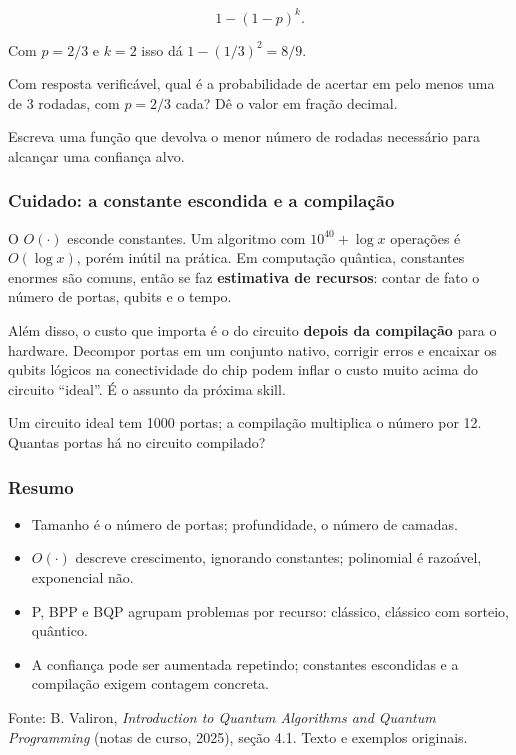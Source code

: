 \[
1-(1-p)^k .
\]

Com \(p = 2/3\) e \(k=2\) isso dá \(1-(1/3)^2 = 8/9\).

Com resposta verificável, qual é a probabilidade de acertar em pelo menos uma de 3 rodadas, com \(p=2/3\) cada? Dê o valor em fração decimal.

Escreva uma função que devolva o menor número de rodadas necessário para alcançar uma confiança alvo.

\subsubsection{Cuidado: a constante escondida e a compilação}\label{cuidado-a-constante-escondida-e-a-compilauxe7uxe3o}

O \(O(\cdot)\) esconde constantes. Um algoritmo com \(10^{40}+\log x\) operações é \(O(\log x)\), porém inútil na prática. Em computação quântica, constantes enormes são comuns, então se faz \textbf{estimativa de recursos}: contar de fato o número de portas, qubits e o tempo.

Além disso, o custo que importa é o do circuito \textbf{depois da compilação} para o hardware. Decompor portas em um conjunto nativo, corrigir erros e encaixar os qubits lógicos na conectividade do chip podem inflar o custo muito acima do circuito ``ideal''. É o assunto da próxima skill.

Um circuito ideal tem 1000 portas; a compilação multiplica o número por 12. Quantas portas há no circuito compilado?

\subsubsection{Resumo}\label{resumo}

\begin{itemize}
\tightlist
\item
  Tamanho é o número de portas; profundidade, o número de camadas.
\item
  \(O(\cdot)\) descreve crescimento, ignorando constantes; polinomial é razoável, exponencial não.
\item
  P, BPP e BQP agrupam problemas por recurso: clássico, clássico com sorteio, quântico.
\item
  A confiança pode ser aumentada repetindo; constantes escondidas e a compilação exigem contagem concreta.
\end{itemize}

Fonte: B. Valiron, \emph{Introduction to Quantum Algorithms and Quantum Programming} (notas de curso, 2025), seção 4.1. Texto e exemplos originais.

